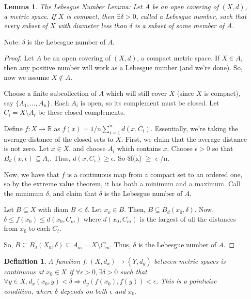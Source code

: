 \documentclass[11pt]{article}
\newtheorem{lemma}{Lemma}[section]
\newtheorem{definition}{Definition}[section]
\begin{document}
\begin{lemma}
The Lebesgue Number Lemma: Let \(A\) be an open covering of \((X,d)\), a metric
space. If \(X\) is compact, then \(\exists \delta > 0\), called a Lebesgue number,
such that every subset of \(X\) with diameter less than \(\delta\) is a subset of
some member of \(A\). 
\end{lemma}

Note: \(\delta\) is the Lebesgue number of \(A\). 

\begin{proof}
Let \(A\) be an open covering of \((X,d)\), a compact metric space. If \(X\in A\),
then any positive number will work as a Lebesgue number (and we're done). So,
now we assume \(X\not\in A\). 

Choose a finite subcollection of \(A\) which will still cover \(X\) (since \(X\) is
compact), say \(\{A_1,\ldots, A_n\}\). Each \(A_i\) is open, so its complement must
be closed. Let \(C_i = X\setminus A_i\) be these closed complements.

Define \(f:X\rightarrow\mathbb{R}\) as \(f(x) = 1/n\sum\limits_{i=1}^n d(x,C_i)\).
Essentially, we're taking the average distance of the closed sets to \(X\). First,
we claim that the average distance is not zero. Let \(x \in X\), and choose \(A_i\)
which contains \(x\). Choose \(\epsilon > 0\) so that \(B_d(x,\epsilon)\subseteq
A_i\). Thus, \(d(x, C_i)\geq \epsilon\). So \$f(x) \(\ge\) \(\epsilon\) /n. 

Now, we have that \(f\) is a continuous map from a compact set to an ordered one,
so by the extreme value theorem, it has both a minimum and a maximum. Call the
minimum \(\delta\), and claim that \(\delta\) is the Lebesgue number of \(A\). 

Let \(B\subseteq X\) with diam \(B < \delta\). Let \(x_o \in B\). Then, \(B\subseteq
B_d(x_0, \delta)\). Now, \(\delta \leq f(x_0) \leq d(x_0, C_m)\) where \(d(x_0,
C_m)\) is the largest of all the distances from \(x_0\) to each \(C_i\). 

So, \(B\subseteq B_d(X_0, \delta) \subseteq A_m = X\setminus C_m\). Thus, \(\delta\)
is the Lebesgue number of \(A\).  
\end{proof}

\begin{definition}
A function \(f:(X, d_x)\rightarrow (Y, d_y)\) between metric spaces is continuous
at \(x_0\in X\) if \(\forall \epsilon > 0, \exists \delta > 0\) such that \(\forall
y\in X, d_x(x_0, y) < \delta \Rightarrow d_y(f(x_0), f(y)) < \epsilon\). This is
a pointwise condition, where \(\delta\) depends on both \(\epsilon\) and \(x_0\).  
\end{definition}
\end{document}
